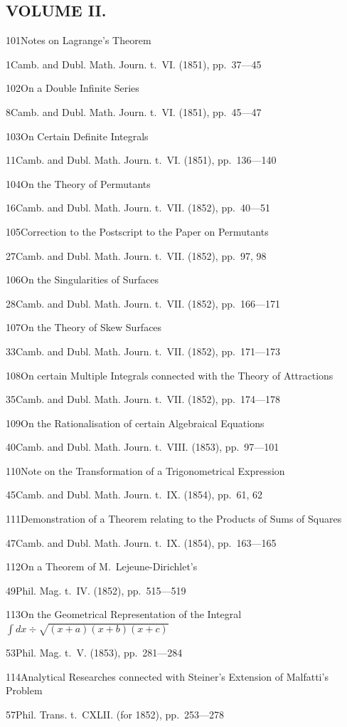 \documentclass[11pt,a4paper]{book}
\providecommand{\tocentry}[2]{#1\dotfill #2\par}
\begin{document}
\newpage

\subsection*{VOLUME II.}

\tocentry{101}{Notes on Lagrange's Theorem}{1}{Camb. and Dubl. Math. Journ. t.~VI. (1851), pp.~37---45}

\tocentry{102}{On a Double Infinite Series}{8}{Camb. and Dubl. Math. Journ. t.~VI. (1851), pp.~45---47}

\tocentry{103}{On Certain Definite Integrals}{11}{Camb. and Dubl. Math. Journ. t.~VI. (1851), pp.~136---140}

\tocentry{104}{On the Theory of Permutants}{16}{Camb. and Dubl. Math. Journ. t.~VII. (1852), pp.~40---51}

\tocentry{105}{Correction to the Postscript to the Paper on Permutants}{27}{Camb. and Dubl. Math. Journ. t.~VII. (1852), pp.~97, 98}

\tocentry{106}{On the Singularities of Surfaces}{28}{Camb. and Dubl. Math. Journ. t.~VII. (1852), pp.~166---171}

\tocentry{107}{On the Theory of Skew Surfaces}{33}{Camb. and Dubl. Math. Journ. t.~VII. (1852), pp.~171---173}

\tocentry{108}{On certain Multiple Integrals connected with the Theory of Attractions}{35}{Camb. and Dubl. Math. Journ. t.~VII. (1852), pp.~174---178}

\tocentry{109}{On the Rationalisation of certain Algebraical Equations}{40}{Camb. and Dubl. Math. Journ. t.~VIII. (1853), pp.~97---101}

\tocentry{110}{Note on the Transformation of a Trigonometrical Expression}{45}{Camb. and Dubl. Math. Journ. t.~IX. (1854), pp.~61, 62}

\tocentry{111}{Demonstration of a Theorem relating to the Products of Sums of Squares}{47}{Camb. and Dubl. Math. Journ. t.~IX. (1854), pp.~163---165}

\tocentry{112}{On a Theorem of M.~Lejeune-Dirichlet's}{49}{Phil. Mag. t.~IV. (1852), pp.~515---519}

\tocentry{113}{On the Geometrical Representation of the Integral $\int dx \div \sqrt{(x+a)(x+b)(x+c)}$}{53}{Phil. Mag. t.~V. (1853), pp.~281---284}

\newpage

\tocentry{114}{Analytical Researches connected with Steiner's Extension of Malfatti's Problem}{57}{Phil. Trans. t.~CXLII. (for 1852), pp.~253---278}
\end{document}
